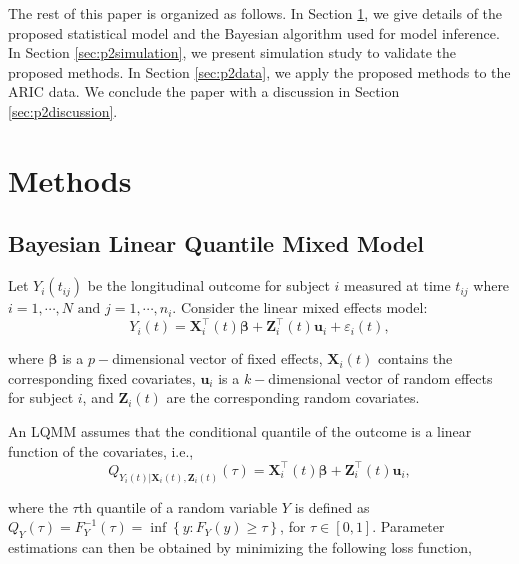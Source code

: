 The rest of this paper is organized as follows. In Section \ref{sec:p2methods}, we give details of the proposed statistical model and the Bayesian algorithm used for model inference. In Section \ref{sec:p2simulation}, we present simulation study to validate the proposed methods. In Section \ref{sec:p2data}, we apply the proposed methods to the ARIC data. We conclude the paper with a discussion in Section \ref{sec:p2discussion}.





\section{Methods}\label{sec:p2methods}
\subsection{Bayesian Linear Quantile Mixed Model}\label{sec:p2BLQMM}
Let $Y_{i}(t_{ij})$ be the longitudinal outcome for subject $i$ measured at time $t_{ij}$ where $i=1, \cdots, N\mbox{ and } j=1,\cdots, n_i$. Consider the linear mixed effects model:
\begin{equation}\label{eqn:p2lmm}
Y_{i}(t) ={\boldsymbol X}_{i}^{\top}(t) \boldsymbol{\beta}+ {\boldsymbol Z}_{i}^{\top}(t)\boldsymbol{u}_i + \varepsilon_{i}(t),
\end{equation}

\noindent where $\boldsymbol{\beta}$ is a $p-$dimensional vector of fixed effects,  ${\boldsymbol X}_{i}(t)$ contains the corresponding fixed covariates, $\boldsymbol{u}_i$ is a $k-$dimensional vector of random effects for subject $i$, and ${\boldsymbol Z}_{i}(t)$ are the corresponding random covariates.

An LQMM assumes that the conditional quantile of the outcome is a linear function of the covariates, i.e.,
\begin{equation}\label{eqn:p2lqmm}
Q_{Y_{i}(t)|{\boldsymbol X}_{i}(t),{\boldsymbol Z}_{i}(t)}(\tau)={\boldsymbol X}_{i}^{\top}(t) \boldsymbol{\beta}+ {\boldsymbol Z}_{i}^{\top}(t)\boldsymbol{u}_i,
\end{equation}

\noindent where the $\tau$th quantile of a random variable $Y$ is defined as $Q_{Y}(\tau)=F_{Y}^{-1}(\tau)=\inf\left\{ y:F_{Y}(y)\geq\tau\right\}$, for $\tau\in [0, 1]$. Parameter estimations can then be obtained by minimizing the following loss function,

